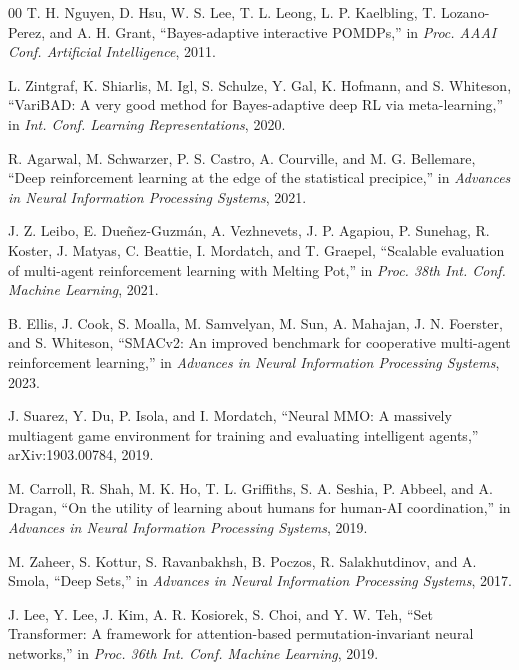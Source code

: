 \documentclass[conference]{IEEEtran}
\begin{document}
\begin{thebibliography}{00}
 T. H. Nguyen, D. Hsu, W. S. Lee, T. L. Leong, L. P. Kaelbling, T. Lozano-Perez, and A. H. Grant, ``Bayes-adaptive interactive POMDPs,'' in \textit{Proc. AAAI Conf. Artificial Intelligence}, 2011.

 L. Zintgraf, K. Shiarlis, M. Igl, S. Schulze, Y. Gal, K. Hofmann, and S. Whiteson, ``VariBAD: A very good method for Bayes-adaptive deep RL via meta-learning,'' in \textit{Int. Conf. Learning Representations}, 2020.

 R. Agarwal, M. Schwarzer, P. S. Castro, A. Courville, and M. G. Bellemare, ``Deep reinforcement learning at the edge of the statistical precipice,'' in \textit{Advances in Neural Information Processing Systems}, 2021.

 J. Z. Leibo, E. Due\~{n}ez-Guzm\'{a}n, A. Vezhnevets, J. P. Agapiou, P. Sunehag, R. Koster, J. Matyas, C. Beattie, I. Mordatch, and T. Graepel, ``Scalable evaluation of multi-agent reinforcement learning with Melting Pot,'' in \textit{Proc. 38th Int. Conf. Machine Learning}, 2021.

 B. Ellis, J. Cook, S. Moalla, M. Samvelyan, M. Sun, A. Mahajan, J. N. Foerster, and S. Whiteson, ``SMACv2: An improved benchmark for cooperative multi-agent reinforcement learning,'' in \textit{Advances in Neural Information Processing Systems}, 2023.

 J. Suarez, Y. Du, P. Isola, and I. Mordatch, ``Neural MMO: A massively multiagent game environment for training and evaluating intelligent agents,'' arXiv:1903.00784, 2019.

 M. Carroll, R. Shah, M. K. Ho, T. L. Griffiths, S. A. Seshia, P. Abbeel, and A. Dragan, ``On the utility of learning about humans for human-AI coordination,'' in \textit{Advances in Neural Information Processing Systems}, 2019.

 M. Zaheer, S. Kottur, S. Ravanbakhsh, B. Poczos, R. Salakhutdinov, and A. Smola, ``Deep Sets,'' in \textit{Advances in Neural Information Processing Systems}, 2017.

 J. Lee, Y. Lee, J. Kim, A. R. Kosiorek, S. Choi, and Y. W. Teh, ``Set Transformer: A framework for attention-based permutation-invariant neural networks,'' in \textit{Proc. 36th Int. Conf. Machine Learning}, 2019.

\end{thebibliography}
\end{document}

